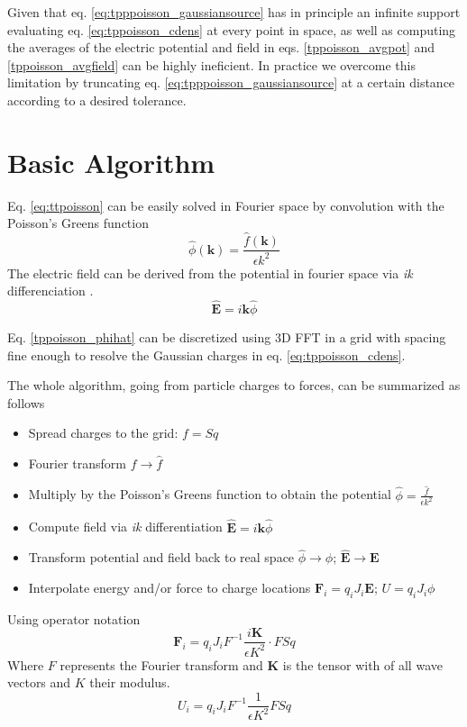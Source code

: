 \documentclass[ twoside,openright,titlepage,numbers=noenddot,%
headinclude,footinclude,cleardoublepage=empty,abstract=on,
BCOR=5mm,paper=a4,fontsize=11pt
]{scrreprt}
\renewcommand{\vec}[1]{\bm{#1}}
\begin{document}
Given that eq. \eqref{eq:tpppoisson_gaussiansource} has in principle an infinite support evaluating eq. \eqref{eq:tppoisson_cdens} at every point in space, as well as computing the averages of the electric potential and field in eqs. \eqref{tppoisson_avgpot} and \eqref{tppoisson_avgfield} can be highly ineficient. In practice we overcome this limitation by truncating eq. \eqref{eq:tpppoisson_gaussiansource} at a certain distance according to a desired tolerance.
\section{Basic Algorithm}
Eq. \eqref{eq:ttpoisson} can be easily solved in Fourier space by convolution with the Poisson's Greens function 
\begin{equation}
  \label{tppoisson_phihat}
 \hat\phi(\vec{k}) = \frac{\hat f(\vec{k})}{\epsilon k^2}
\end{equation}   
The electric field can be derived from the potential in fourier space via \emph{ik} differenciation \cite{ikdiff}.
\begin{equation}
  \hat{\vec{E}} = i\vec{k}\hat{\phi}
\end{equation}

Eq. \eqref{tppoisson_phihat} can be discretized using 3D \gls{FFT} in a grid with spacing fine enough to resolve the Gaussian charges in eq. \eqref{eq:tppoisson_cdens}.

The whole algorithm, going from particle charges to forces, can be summarized as follows
\begin{itemize}
\item Spread charges to the grid: $f=Sq$
\item Fourier transform $f\rightarrow \hat{f}$
\item Multiply by the Poisson's Greens function to obtain the potential $\hat{\phi}=\frac{\hat{f}}{\epsilon k^2}$
\item Compute field via \emph{ik} differentiation $\hat{\vec{E}} = i\vec{k}\hat{\phi}$
\item Transform potential and field back to real space $\hat{\phi} \rightarrow \phi$; $\hat{\vec{E}} \rightarrow \vec{E}$
\item Interpolate energy and/or force to charge locations $\vec{F}_i = q_iJ_i\vec{E}$; $U = q_iJ_i\phi$
\end{itemize}
Using operator notation
\begin{equation}
  \label{eq:tppoison_alg}
  \vec{F}_i = q_iJ_iF^{-1} \frac{i\vec{K}}{\epsilon K^2} \cdot F Sq
\end{equation}
Where $F$ represents the Fourier transform and $\vec{K}$ is the tensor with of all wave vectors and $K$ their modulus.
\begin{equation}
  \label{eq:tppoison_alg_u}
  U_i = q_iJ_iF^{-1} \frac{1}{\epsilon K^2}F Sq
\end{equation}
\end{document}
